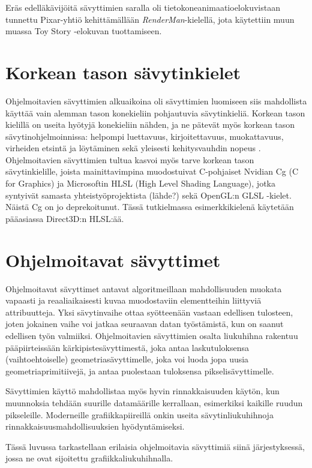 \documentclass[finnish]{tktltiki2}
\theoremstyle{definition}
\theoremstyle{remark}
\begin{document}
Eräs edelläkävijöitä sävyttimien saralla oli tietokoneanimaatioelokuvistaan tunnettu Pixar-yhtiö kehittämällään \emph{RenderMan}-kielellä, jota käytettiin muun muassa Toy Story -elokuvan tuottamiseen.

\section{Korkean tason sävytinkielet}

Ohjelmoitavien sävyttimien alkuaikoina oli sävyttimien luomiseen siis mahdollista käyttää vain alemman tason konekieliin pohjautuvia sävytinkieliä. Korkean tason kielillä on useita hyötyjä konekieliin nähden, ja ne pätevät myös korkean tason sävytinohjelmoinnissa: helpompi luettavuus, kirjoitettavuus, muokattavuus, virheiden etsintä ja löytäminen sekä yleisesti kehitysvauhdin nopeus \cite{She08}. Ohjelmoitavien sävyttimien tultua kasvoi myös tarve korkean tason sävytinkielille, joista mainittavimpina muodostuivat C-pohjaiset Nvidian Cg (C for Graphics) ja Microsoftin HLSL (High Level Shading Language), jotka syntyivät samasta yhteistyöprojektista (lähde?) sekä OpenGL:n GLSL -kielet. Näistä Cg on jo deprekoitunut. Tässä tutkielmassa esimerkkikielenä käytetään pääasiassa Direct3D:n HLSL:ää.

\section{Ohjelmoitavat sävyttimet}

Ohjelmoitavat sävyttimet antavat algoritmeillaan mahdollisuuden muokata vapaasti ja reaaliaikaisesti kuvaa muodostaviin elementteihin liittyviä attribuutteja. Yksi sävytinvaihe ottaa syötteenään vastaan edellisen tulosteen, joten jokainen vaihe voi jatkaa seuraavan datan työstämistä, kun on saanut edellisen työn valmiiksi. Ohjelmoitavien sävyttimien osalta liukuhihna rakentuu pääpiirteissään kärkipistesävyttimestä, joka antaa laskutuloksensa (vaihtoehtoiselle) geometriasävyttimelle, joka voi luoda jopa uusia geometriaprimitiivejä, ja antaa puolestaan tuloksensa pikselisävyttimelle.

Sävyttimien käyttö mahdollistaa myös hyvin rinnakkaisuuden käytön, kun muunnoksia tehdään suurille datamäärille kerrallaan, esimerkiksi kaikille ruudun pikseleille. Moderneille grafiikkapiireillä onkin useita sävytinliukuhihnoja rinnakkaisuusmahdollisuuksien hyödyntämiseksi.

Tässä luvussa tarkastellaan erilaisia ohjelmoitavia sävyttimiä siinä järjestyksessä, jossa ne ovat sijoitettu grafiikkaliukuhihnalla.
\end{document}
